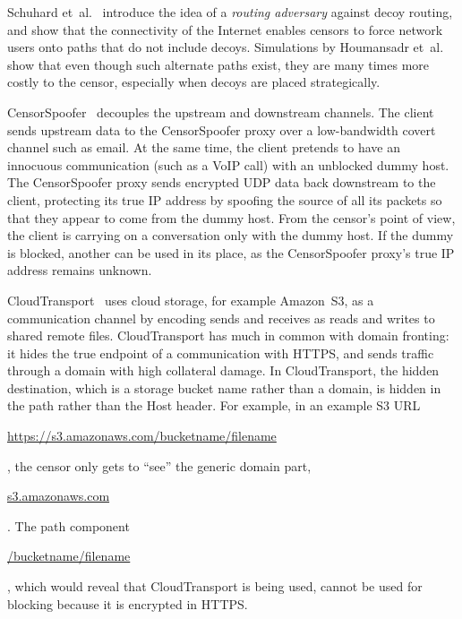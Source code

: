 \documentclass[conference]{IEEEtran}
\begin{document}
Schuhard et~al.~\cite{ccs2012-decoys}
introduce the idea of a \emph{routing adversary} against decoy routing,
and show that the connectivity of the Internet enables
censors to force network users onto paths that do not include decoys.
Simulations by Houmansadr et~al.~\cite{nodirectionhome}
show that even though such alternate paths exist,
they are many times more costly to the censor,
especially when decoys are placed strategically.

CensorSpoofer~\cite{censorspoofer}
decouples the upstream and downstream channels.
The client sends upstream data to the CensorSpoofer proxy over a low-bandwidth covert channel such as email.
At the same time, the client pretends to have an innocuous communication (such as a VoIP call) with an unblocked dummy host.
The CensorSpoofer proxy sends encrypted UDP data back downstream to the client,
protecting its true IP address by spoofing the source of all its packets
so that they appear to come from the dummy host.
From the censor's point of view, the client is carrying on a conversation only with the dummy host.
If the dummy is blocked, another can be used in its place,
as the CensorSpoofer proxy's true IP address remains unknown.

CloudTransport~\cite{cloudtransport} uses cloud storage, for example Amazon~S3,
as a communication channel by encoding sends and receives as reads and writes to shared remote files.
CloudTransport has much in common with domain fronting:
it hides the true endpoint of a communication with HTTPS,
and sends traffic through a domain with high collateral damage.
In CloudTransport, the hidden destination, which is a storage bucket name rather than a domain,
is hidden in the path rather than the Host header.
For example, in an example S3 URL
\begin{NoHyper}\url{https://s3.amazonaws.com/bucketname/filename}\end{NoHyper},
the censor only gets to ``see'' the generic domain part, \begin{NoHyper}\url{s3.amazonaws.com}\end{NoHyper}.
The path component \begin{NoHyper}\url{/bucketname/filename}\end{NoHyper},
which would reveal that CloudTransport is being used,
cannot be used for blocking because it is encrypted in HTTPS.
\end{document}
